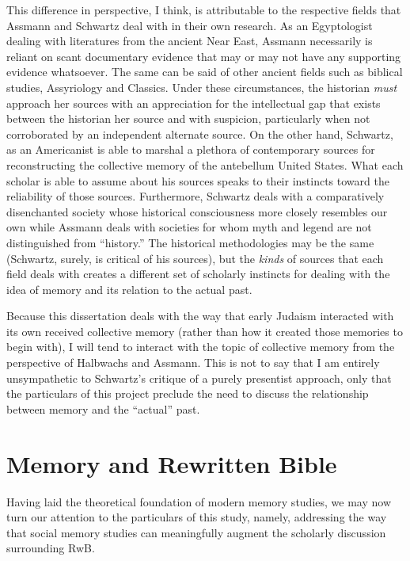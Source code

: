 This difference in perspective, I think, is attributable to the
respective fields that Assmann and Schwartz deal with in their own
research. As an Egyptologist dealing with literatures from the ancient
Near East, Assmann necessarily is reliant on scant documentary evidence
that may or may not have any supporting evidence whatsoever. The same
can be said of other ancient fields such as biblical studies,
Assyriology and Classics. Under these circumstances, the historian
\emph{must} approach her sources with an appreciation for the
intellectual gap that exists between the historian her source and with
suspicion, particularly when not corroborated by an independent
alternate source. On the other hand, Schwartz, as an Americanist is able
to marshal a plethora of contemporary sources for reconstructing the
collective memory of the antebellum United States. What each scholar is
able to assume about his sources speaks to their instincts toward the
reliability of those sources. Furthermore, Schwartz deals with a
comparatively disenchanted society whose historical consciousness more
closely resembles our own while Assmann deals with societies for whom
myth and legend are not distinguished from ``history.'' The historical
methodologies may be the same (Schwartz, surely, is critical of his
sources), but the \emph{kinds} of sources that each field deals with
creates a different set of scholarly instincts for dealing with the idea
of memory and its relation to the actual past.

Because this dissertation deals with the way that early Judaism
interacted with its own received collective memory (rather than how it
created those memories to begin with), I will tend to interact with the
topic of collective memory from the perspective of Halbwachs and
Assmann. This is not to say that I am entirely unsympathetic to
Schwartz's critique of a purely presentist approach, only that the
particulars of this project preclude the need to discuss the
relationship between memory and the ``actual'' past.

\hypertarget{memory-and-rwb}{%
\section{Memory and Rewritten Bible}\label{memory-and-rwb}}

Having laid the theoretical foundation of modern memory studies, we may
now turn our attention to the particulars of this study, namely,
addressing the way that social memory studies can meaningfully augment
the scholarly discussion surrounding RwB.\autocite[See
also][]{brooke_zsengeller2014}

